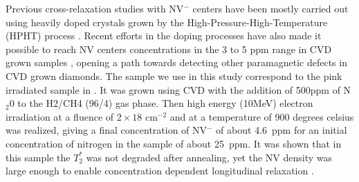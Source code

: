 \documentclass[9pt,twocolumn,twoside]{revtex4-1}
\begin{document}
Previous cross-relaxation studies with NV$^-$ centers have been mostly carried out using heavily doped crystals grown by the High-Pressure-High-Temperature (HPHT) process \citep{Epstein,Wang, armstrong_nvnv_2010, Hall, Wickenbrock, Alfasi}. 
 Recent efforts in the doping processes have also made it possible to reach NV centers concentrations in the 3 to 5 ppm range in CVD grown samples \cite{Edmonds, TALLAIRE2020421, MINDARAVA2020182}, opening a path towards detecting other paramagnetic defects in CVD grown diamonds. 
The sample we use in this study  correspond to the pink irradiated sample in \cite{TALLAIRE2020421}. It was grown using CVD with the addition of 500ppm of N$_2$0 to the H2/CH4 (96/4) gas phase.
Then high energy (10MeV) electron irradiation at a fluence of $2\times18$ cm$^{-2}$ and at a temperature of 900 degrees celsius was realized,  giving a final concentration of NV$^-$ of about 4.6~ppm for an initial concentration of nitrogen in the sample of about 25~ppm.
It was shown that in this sample the $T_2^*$ was not degraded after annealing, yet the NV density was large enough to enable concentration dependent longitudinal relaxation \cite{TALLAIRE2020421, jarmola_longitudinal_2015}.  
 
\end{document}
